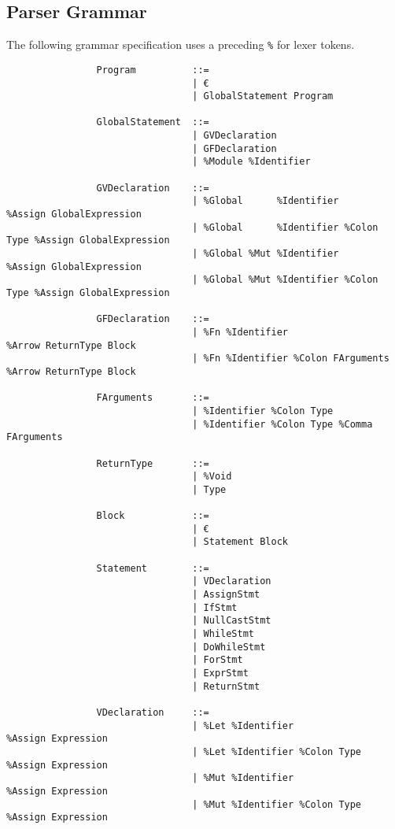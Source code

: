 \documentclass{article}
\begin{document}
		\subsection{Parser Grammar}
		
			The following grammar specification uses a preceding \texttt{\%} for lexer tokens.
		
			\begin{verbatim}
				Program          ::=
				                 | €
				                 | GlobalStatement Program
				                 
				GlobalStatement  ::=
				                 | GVDeclaration
				                 | GFDeclaration
				                 | %Module %Identifier
				                 
				GVDeclaration    ::=
				                 | %Global      %Identifier             %Assign GlobalExpression
				                 | %Global      %Identifier %Colon Type %Assign GlobalExpression
				                 | %Global %Mut %Identifier             %Assign GlobalExpression
				                 | %Global %Mut %Identifier %Colon Type %Assign GlobalExpression
				                 
				GFDeclaration    ::=
				                 | %Fn %Identifier                   %Arrow ReturnType Block
				                 | %Fn %Identifier %Colon FArguments %Arrow ReturnType Block
				                 
				FArguments       ::=
				                 | %Identifier %Colon Type
				                 | %Identifier %Colon Type %Comma FArguments
				
				ReturnType       ::=
				                 | %Void
				                 | Type
				                 
				Block            ::=
				                 | €
				                 | Statement Block
				
				Statement        ::=
				                 | VDeclaration
				                 | AssignStmt
				                 | IfStmt
				                 | NullCastStmt
				                 | WhileStmt
				                 | DoWhileStmt
				                 | ForStmt
				                 | ExprStmt
				                 | ReturnStmt
				                 
				VDeclaration     ::=
				                 | %Let %Identifier             %Assign Expression
				                 | %Let %Identifier %Colon Type %Assign Expression
				                 | %Mut %Identifier             %Assign Expression
				                 | %Mut %Identifier %Colon Type %Assign Expression
				                 

\end{verbatim}
\end{document}
